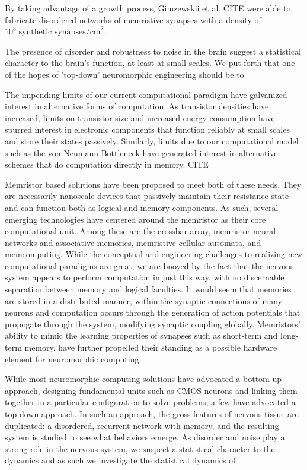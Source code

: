 \documentclass[aps,prl,preprint,groupedaddress]{revtex4-1}
\begin{document}
By taking advantage of a growth process, Gimzewskii et
al. CITE were able to fabricate disordered networks of memristive synapses
with a density of $10^8\; \text{synthetic synapses/cm}^2$.

The presence of disorder and robustness to noise in the brain
suggest a statistical character to the brain's function, at least at small
scales.  We put forth that one of the hopes of 'top-down' neuromorphic
engineering should be to 

The impending limits of our current computational paradigm have galvanized
interest in alternative forms of computation. As transistor densities have
increased, limits on transistor size and increased energy consumption have
spurred interest in electronic components that function reliably at small
scales and store their states passively.  Similarly, limits due to our
computational model such as the von Neumann Bottleneck have generated
interest in alternative schemes that do computation directly in memory.
CITE

Memristor based solutions have been proposed to meet both of these needs.
They are
necessarily nanoscale devices that passively maintain their resistance
state and can function both as logical and memory components.  As such,
several emerging technologies have centered around the memristor as
their core computational unit.  Among these are the crossbar array,
memristor neural networks and associative memories, memristive cellular
automata, and memcomputing.  While the conceptual and engineering
challenges to realizing new computational paradigms are great, we are
buoyed by the fact that the nervous system appears to perform computation
in just this way, with no discernable separation between memory and
logical faculties.  It would seem that memories are stored in a
distributed manner, within the synaptic connections of many neurons
and computation occurs through the generation of action potentials that
propogate through the system, modifying synaptic coupling globally.
Memristors' ability to mimic the learning properties of synapses such as
short-term and long-term memory, have further propelled their standing as
a possible hardware element for neuromorphic computing.

While most neuromorphic computing solutions have advocated a bottom-up
approach, designing fundamental units such as CMOS neurons
and linking them together in a
particular configuration to solve problems, a few have advocated a top
down approach.  In such an approach, the gross features of nervous
tissue are duplicated: a disordered, recurrent network with memory, and
the resulting system is studied to see what behaviors emerge.  As disorder
and noise play a strong role in the nervous system, we suspect a statistical
character to the dynamics and as such we investigate the statistical
dynamics of 
\end{document}
